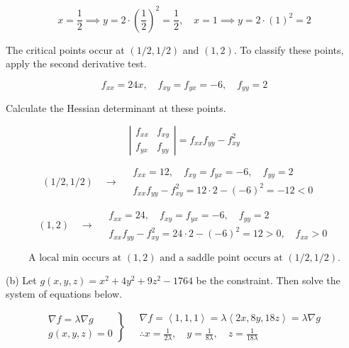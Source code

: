 \documentclass{article}
\begin{document}
\[x=\frac12\implies y=2\cdot\left(\frac12\right)^2=\frac12,\quad x=1\implies y=2\cdot(1)^2=2\]

\hfill

\noindent The critical points occur at $\left(1/2,1/2\right)$ and $(1,2)$. To classify these points, apply the second derivative test.

\[f_{xx}=24x,\quad f_{xy}=f_{yx}=-6,\quad f_{yy}=2\]

\hfill

\noindent Calculate the Hessian determinant at these points.

\[\left|\begin{array}{cc}
f_{xx}&f_{xy}\\
f_{yx}&f_{yy}
\end{array}\right|=f_{xx}f_{yy}-f_{xy}^2\]

\hfill

\[(1/2,1/2)\quad\rightarrow\quad\begin{array}{l}f_{xx}=12,\quad f_{xy}=f_{yx}=-6,\quad f_{yy}=2\\[1em]
f_{xx}f_{yy}-f_{xy}^2=12\cdot2-(-6)^2=-12<0\quad\end{array}\]

\hfill

\[(1,2)\quad\rightarrow\quad\begin{array}{l}f_{xx}=24,\quad f_{xy}=f_{yx}=-6,\quad f_{yy}=2\\[1em]f_{xx}f_{yy}-f_{xy}^2=24\cdot2-(-6)^2=12>0,\quad f_{xx}>0\end{array}\]

\hfill

\[\boxed{\text{A local min occurs at } (1,2) \text{ and a saddle point occurs at } (1/2,1/2).}\]

\hfill

\noindent (b) Let $g(x,y,z)=x^2+4y^2+9z^2-1764$ be the constraint. Then solve the system of equations below.

\[
\left.
\begin{array}{ll}
\displaystyle\nabla f=\lambda\nabla g\\
\displaystyle g(x,y,z)=0
\end{array}
\right\}\quad
\begin{array}{ll}
\nabla f=\left\langle1,1,1\right\rangle=\lambda\left\langle2x,8y,18z\right\rangle=\lambda\nabla g\\[1em]\displaystyle\therefore x=\frac1{2\lambda},\quad y=\frac1{8\lambda},\quad z=\frac1{18\lambda}
\end{array}
\]
\end{document}
